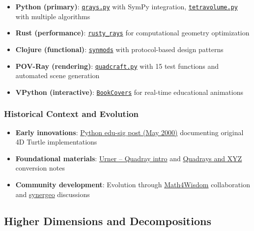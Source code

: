 \documentclass[
  10pt,
]{article}
\providecommand{\tightlist}{%
  \setlength{\itemsep}{0pt}\setlength{\parskip}{0pt}}
\begin{document}
\begin{itemize}
\tightlist
\item
  \textbf{Python (primary)}:
  \href{https://github.com/4dsolutions/m4w/blob/main/qrays.py}{\texttt{qrays.py}}
  with SymPy integration,
  \href{https://github.com/4dsolutions/m4w/blob/main/tetravolume.py}{\texttt{tetravolume.py}}
  with multiple algorithms
\item
  \textbf{Rust (performance)}:
  \href{https://github.com/4dsolutions/rusty_rays}{\texttt{rusty\_rays}}
  for computational geometry optimization
\item
  \textbf{Clojure (functional)}:
  \href{https://github.com/4dsolutions/synmods}{\texttt{synmods}} with
  protocol-based design patterns
\item
  \textbf{POV-Ray (rendering)}:
  \href{https://github.com/4dsolutions/School_of_Tomorrow/blob/master/quadcraft.py}{\texttt{quadcraft.py}}
  with 15 test functions and automated scene generation
\item
  \textbf{VPython (interactive)}:
  \href{https://github.com/4dsolutions/BookCovers}{\texttt{BookCovers}}
  for real-time educational animations
\end{itemize}

\hypertarget{historical-context-and-evolution}{%
\subsubsection{Historical Context and
Evolution}\label{historical-context-and-evolution}}

\begin{itemize}
\tightlist
\item
  \textbf{Early innovations}:
  \href{https://mail.python.org/pipermail/edu-sig/2000-May/000498.html}{Python
  edu-sig post (May 2000)} documenting original 4D Turtle
  implementations
\item
  \textbf{Foundational materials}:
  \href{https://www.grunch.net/synergetics/quadintro.html}{Urner --
  Quadray intro} and
  \href{https://www.grunch.net/synergetics/quadxyz.html}{Quadrays and
  XYZ} conversion notes
\item
  \textbf{Community development}: Evolution through
  \href{https://coda.io/@daniel-ari-friedman/math4wisdom/ivm-xyz-40}{Math4Wisdom}
  collaboration and \href{https://groups.io/g/synergeo/topics}{synergeo}
  discussions
\end{itemize}

\hypertarget{higher-dimensions-and-decompositions}{%
\subsection{Higher Dimensions and
Decompositions}\label{higher-dimensions-and-decompositions}}
\end{document}
